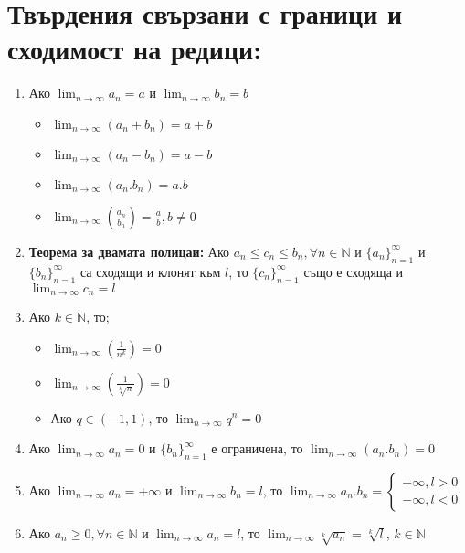 \documentclass[11pt,oneside,a4paper]{article}
\begin{document}
\section*{Твърдения свързани с граници и сходимост на редици:}

\begin{enumerate}
    \item Ако \(\displaystyle \lim_{n \to \infty} a_n = a\) и \(\displaystyle \lim_{n \to \infty} b_n = b\)
    \begin{itemize}
        \item \(\displaystyle \lim_{n \to \infty} (a_n + b_n) = a + b\)
        \item \(\displaystyle \lim_{n \to \infty} (a_n - b_n) = a - b\)
        \item \(\displaystyle \lim_{n \to \infty} (a_n . b_n) = a.b\)
        \item \(\displaystyle \lim_{n \to \infty} (\frac{a_n}{b_n}) = \frac{a}{b}, b \neq 0\)
    \end{itemize}
    \item \textbf{Теорема за двамата полицаи: } Ако \(a_n \leq c_n \leq b_n, \forall n \in \mathbb{N}\) и \(\{a_n\}^\infty_{n=1}\) и \(\{b_n\}^\infty_{n=1}\) са сходящи и клонят към \(l\), то \(\{c_n\}^{\infty}_{n=1}\) също е сходяща и \(\displaystyle \lim_{n \to \infty} c_n = l\)
    \item Ако \(k \in \mathbb{N}\), то;
    \begin{itemize}
        \item \(\displaystyle \lim_{n \to \infty} (\frac{1}{n^k}) = 0\)
        \item \(\displaystyle \lim_{n \to \infty} (\frac{1}{\sqrt[k]{n}}) = 0\)
        \item Ако \(q \in (-1, 1)\), то \(\displaystyle \lim_{n \to \infty} q^n = 0\)
    \end{itemize}
    \item Ако \(\displaystyle \lim_{n \to \infty} a_n = 0\) и \(\{b_n\}^{\infty}_{n=1}\) е ограничена, то \(\displaystyle \lim_{n \to \infty} (a_n . b_n) = 0\)
    \item Ако \(\displaystyle \lim_{n \to \infty} a_n = +\infty\) и \(\displaystyle \lim_{n \to \infty} b_n = l\), то \(\displaystyle \lim_{n \to \infty} a_n.b_n = \begin{cases} +\infty, l > 0 \\ -\infty, l < 0\end{cases}\)
    \item Ако \(a_n \geq 0, \forall n \in \mathbb{N}\) и \(\displaystyle \lim_{n \to \infty} a_n = l\), то \(\displaystyle \lim_{n \to \infty} \sqrt[k]{a_n} = \sqrt[k]{l}\), \(k \in \mathbb{N}\)

\end{enumerate}
\end{document}
